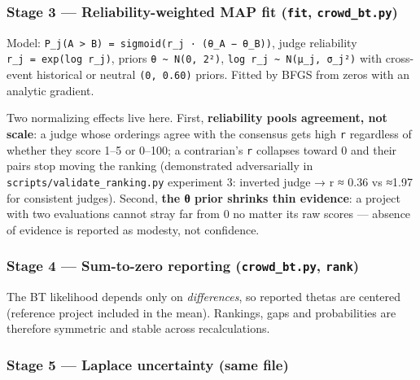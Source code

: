 \documentclass[
  11pt,
]{article}
\begin{document}
\hypertarget{stage-3-reliability-weighted-map-fit-fit-crowd_bt.py}{%
\subsubsection{\texorpdfstring{Stage 3 --- Reliability-weighted MAP fit
(\texttt{fit},
\texttt{crowd\_bt.py})}{Stage 3 --- Reliability-weighted MAP fit (fit, crowd\_bt.py)}}\label{stage-3-reliability-weighted-map-fit-fit-crowd_bt.py}}

Model:
\texttt{P\_j(A\ \textgreater{}\ B)\ =\ sigmoid(r\_j\ ·\ (θ\_A\ −\ θ\_B))},
judge reliability \texttt{r\_j\ =\ exp(log\ r\_j)}, priors
\texttt{θ\ \textasciitilde{}\ N(0,\ 2²)},
\texttt{log\ r\_j\ \textasciitilde{}\ N(μ\_j,\ σ\_j²)} with cross-event
historical or neutral \texttt{(0,\ 0.60)} priors. Fitted by BFGS from
zeros with an analytic gradient.

Two normalizing effects live here. First, \textbf{reliability pools
agreement, not scale}: a judge whose orderings agree with the consensus
gets high \texttt{r} regardless of whether they score 1--5 or 0--100; a
contrarian's \texttt{r} collapses toward 0 and their pairs stop moving
the ranking (demonstrated adversarially in
\texttt{scripts/validate\_ranking.py} experiment 3: inverted judge → r ≈
0.36 vs ≈1.97 for consistent judges). Second, \textbf{the θ prior
shrinks thin evidence}: a project with two evaluations cannot stray far
from 0 no matter its raw scores --- absence of evidence is reported as
modesty, not confidence.

\hypertarget{stage-4-sum-to-zero-reporting-crowd_bt.py-rank}{%
\subsubsection{\texorpdfstring{Stage 4 --- Sum-to-zero reporting
(\texttt{crowd\_bt.py},
\texttt{rank})}{Stage 4 --- Sum-to-zero reporting (crowd\_bt.py, rank)}}\label{stage-4-sum-to-zero-reporting-crowd_bt.py-rank}}

The BT likelihood depends only on \emph{differences}, so reported thetas
are centered (reference project included in the mean). Rankings, gaps
and probabilities are therefore symmetric and stable across
recalculations.

\hypertarget{stage-5-laplace-uncertainty-same-file}{%
\subsubsection{Stage 5 --- Laplace uncertainty (same
file)}\label{stage-5-laplace-uncertainty-same-file}}
\end{document}
